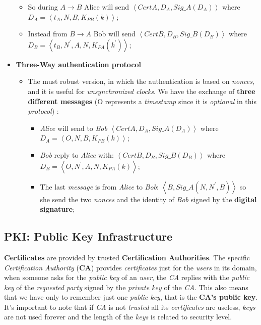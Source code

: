 \documentclass{article}
\begin{document}
\begin{itemize}
\begin{itemize}
\item So during $A \rightarrow B$ Alice will send $\left \langle CertA, D_A, Sig\_A(D_A) \right \rangle$ where $D_A = \left \langle t_A, N, B, K_{PB}(k) \right \rangle$;
\item Instead from $B \rightarrow A$ Bob will send  $\left \langle CertB, D_B, Sig\_B(D_B) \right \rangle$ where $D_B = \left \langle t_B, N^{'}, A, N, K_{PA}(k^{'}) \right \rangle$;
\end{itemize}
\item \textbf{Three-Way authentication protocol}
\begin{itemize}
\item The must robust version, in which the authentication is based on \emph{nonces}, and it is useful for \emph{unsynchronized clocks}. We have the exchange of \textbf{three different messages} (O represents a \emph{timestamp} since it is \emph{optional} in this \emph{protocol}) :
\begin{itemize}
\item \emph{Alice} will send to \emph{Bob} $\left \langle CertA, D_A, Sig\_A(D_A) \right \rangle$ where $D_A =  \left \langle O, N, B, K_{PB}(k) \right \rangle$;
\item \emph{Bob} reply to \emph{Alice} with: $\left \langle CertB, D_B, Sig\_B(D_B) \right \rangle$ where $D_B = \left \langle O, N^{'}, A, N, K_{PA}(k) \right \rangle$;
\item The last \emph{message} is from \emph{Alice} to \emph{Bob}: $\left \langle B, Sig\_A(N, N^{'}, B) \right \rangle$ so she send the two \emph{nonces} and the identity of \emph{Bob} signed by the \textbf{digital signature};
\end{itemize}
\end{itemize}
\end{itemize}
\clearpage
\subsection{PKI: Public Key Infrastructure}
\textbf{Certificates} are provided by trusted \textbf{Certification Authorities}. The specific \emph{Certification Authority} (\textbf{CA}) provides \emph{certificates} just for the \emph{users} in its domain, when someone asks for the \emph{public key} of an \emph{user}, the \emph{CA} replies with the \emph{public key} of the \emph{requested party} signed by the \emph{private key} of the \emph{CA}. This also means that we have only to remember just one \emph{public key}, that is the \textbf{CA’s public key}. It's important to note that if \emph{CA} is not \emph{trusted} all its \emph{certificates} are useless, \emph{keys} are not used forever and the length of the \emph{keys} is related to security level. 
\end{document}
